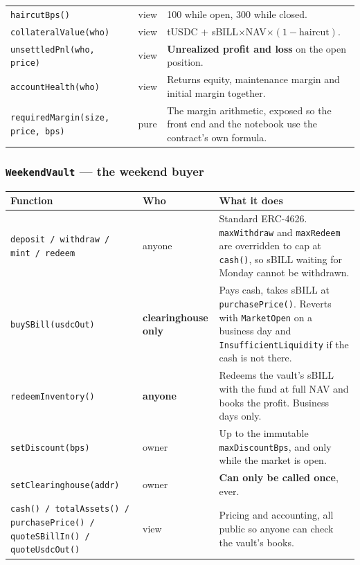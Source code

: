 \documentclass[11pt,a4paper]{article}
\begin{document}
\begin{center}
\begin{tabular}{@{}p{4.5cm}p{2.0cm}p{8.8cm}@{}}
\texttt{haircutBps()} & view & 100 while open, 300 while closed. \\
\texttt{collateralValue(who)} & view & tUSDC $+$ sBILL$\times$NAV$\times(1-\text{haircut})$. \\
\texttt{unsettledPnl(who, price)} & view & \textbf{Unrealized profit and loss} on the open position. \\
\texttt{accountHealth(who)} & view & Returns equity, maintenance margin and initial margin together. \\
\texttt{requiredMargin(size, price, bps)} & pure & The margin arithmetic, exposed so the front end and the notebook use the contract's own formula. \\
\bottomrule
\end{tabular}
\end{center}

\subsubsection*{\texttt{WeekendVault} --- the weekend buyer}

\begin{center}
\footnotesize
\begin{tabular}{@{}p{4.3cm}p{2.2cm}p{8.8cm}@{}}
\toprule
\textbf{Function} & \textbf{Who} & \textbf{What it does} \\
\midrule
\texttt{deposit / withdraw / mint / redeem} & anyone & Standard ERC-4626. \texttt{maxWithdraw} and \texttt{maxRedeem} are overridden to cap at \texttt{cash()}, so sBILL waiting for Monday cannot be withdrawn. \\
\texttt{buySBill(usdcOut)} & \textbf{clearinghouse only} & Pays cash, takes sBILL at \texttt{purchasePrice()}. Reverts with \texttt{MarketOpen} on a business day and \texttt{InsufficientLiquidity} if the cash is not there. \\
\texttt{redeemInventory()} & \textbf{anyone} & Redeems the vault's sBILL with the fund at full NAV and books the profit. Business days only. \\
\texttt{setDiscount(bps)} & owner & Up to the immutable \texttt{maxDiscountBps}, and only while the market is open. \\
\texttt{setClearinghouse(addr)} & owner & \textbf{Can only be called once}, ever. \\
\texttt{cash() / totalAssets() / purchasePrice() / quoteSBillIn() / quoteUsdcOut()} & view & Pricing and accounting, all public so anyone can check the vault's books. \\
\bottomrule
\end{tabular}
\end{center}
\end{document}
